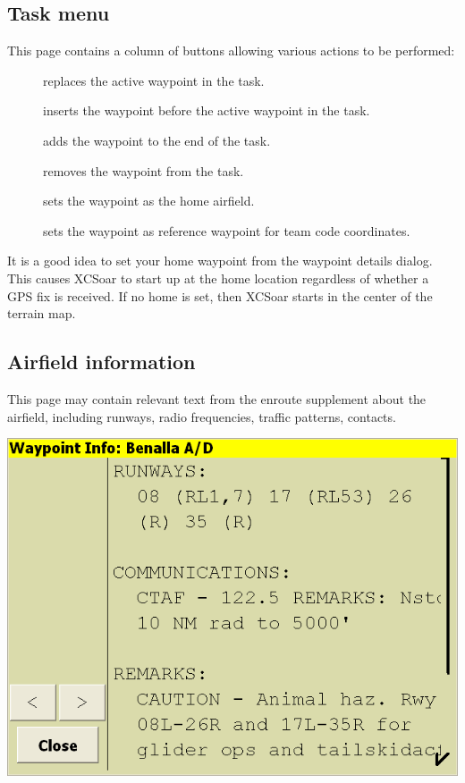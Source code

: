\documentclass[a4paper,12pt]{refrep}
\begin{document}
\subsection*{Task menu}  
This page contains a column of buttons allowing various actions to be performed:
\begin{description}
\item[] replaces the active waypoint in the task.
\item[] inserts the waypoint before the active waypoint in
  the task.
\item[] adds the waypoint to the end of the task.
\item[] removes the waypoint from the task.
\item[] sets the waypoint as the home airfield.
\item[] sets the waypoint as reference waypoint for
  team code coordinates.

\end{description}

It is a good idea to set your home waypoint from the waypoint details
dialog. This causes XCSoar to start up at the home location regardless
of whether a GPS fix is received.  If no home is set, then XCSoar
starts in the center of the terrain map.

\subsection*{Airfield information}
This page may contain relevant text from the enroute supplement about
the airfield, including runways, radio frequencies, traffic patterns,
contacts.
\begin{center}
\includegraphics[angle=0,width=0.8\linewidth,keepaspectratio='true']{figures/dialog-waypointdetails1.png}
\end{center}
\end{document}
